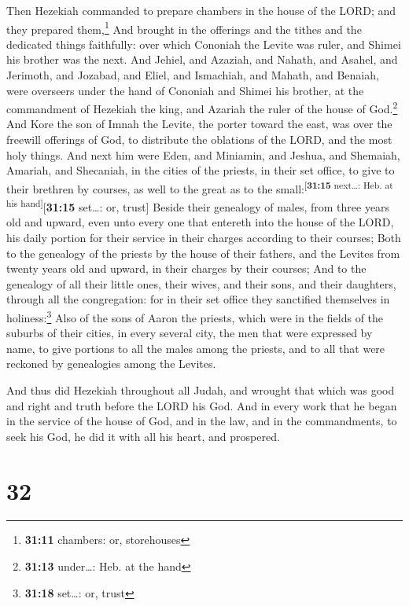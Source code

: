  Then Hezekiah commanded to prepare chambers in the house
of the LORD; and they prepared them,\footnote{\textbf{31:11} chambers:
  or, storehouses}  And brought in the offerings and the
tithes and the dedicated things faithfully: over which Cononiah the
Levite was ruler, and Shimei his brother was the next. 
And Jehiel, and Azaziah, and Nahath, and Asahel, and Jerimoth, and
Jozabad, and Eliel, and Ismachiah, and Mahath, and Benaiah, were
overseers under the hand of Cononiah and Shimei his brother, at the
commandment of Hezekiah the king, and Azariah the ruler of the house of
God.\footnote{\textbf{31:13} under\ldots: Heb. at the hand}
 And Kore the son of Imnah the Levite, the porter toward
the east, was over the freewill offerings of God, to distribute the
oblations of the LORD, and the most holy things.  And
next him were Eden, and Miniamin, and Jeshua, and Shemaiah, Amariah, and
Shecaniah, in the cities of the priests, in their set office, to give to
their brethren by courses, as well to the great as to the
small:\textsuperscript{{[}\textbf{31:15} next\ldots: Heb. at his
hand{]}}{[}\textbf{31:15} set\ldots: or, trust{]}  Beside
their genealogy of males, from three years old and upward, even unto
every one that entereth into the house of the LORD, his daily portion
for their service in their charges according to their courses;
 Both to the genealogy of the priests by the house of
their fathers, and the Levites from twenty years old and upward, in
their charges by their courses;  And to the genealogy of
all their little ones, their wives, and their sons, and their daughters,
through all the congregation: for in their set office they sanctified
themselves in holiness:\footnote{\textbf{31:18} set\ldots: or, trust}
 Also of the sons of Aaron the priests, which were in the
fields of the suburbs of their cities, in every several city, the men
that were expressed by name, to give portions to all the males among the
priests, and to all that were reckoned by genealogies among the Levites.

 And thus did Hezekiah throughout all Judah, and wrought
that which was good and right and truth before the LORD his God.
 And in every work that he began in the service of the
house of God, and in the law, and in the commandments, to seek his God,
he did it with all his heart, and prospered.

\hypertarget{section-31}{%
\section{32}\label{section-31}}

